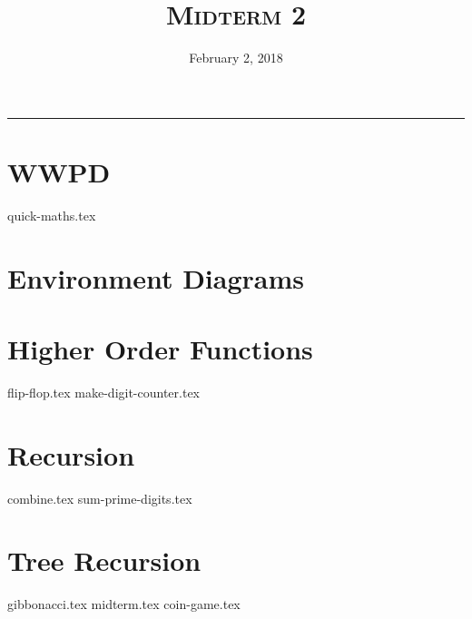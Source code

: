 \documentclass{exam}
\title{\textsc{Midterm 2}}
\date{February 2, 2018}
\begin{document}
\maketitle
\rule{\textwidth}{0.15em}
\fontsize{12}{15}\selectfont



\section{WWPD}
\begin{questions}
{quick-maths.tex}
\end{questions}

\section{Environment Diagrams}

\section{Higher Order Functions}
\begin{questions}
{flip-flop.tex}
{make-digit-counter.tex}
\end{questions}

\section{Recursion}
\begin{questions}
{combine.tex}
{sum-prime-digits.tex}
\end{questions}

\section{Tree Recursion}
\begin{questions}
{gibbonacci.tex}
{midterm.tex}
{coin-game.tex}
\end{questions}
\end{document}
